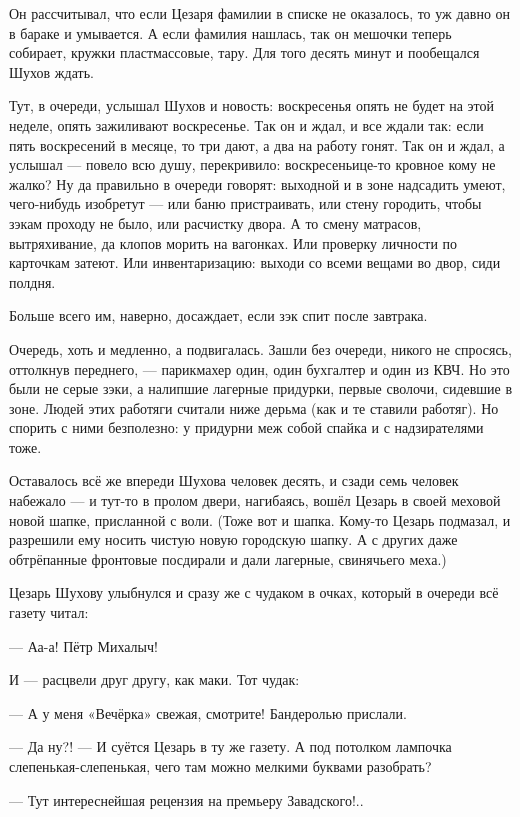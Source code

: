 Он рассчитывал, что если Цезаря фамилии в списке не оказалось, то уж давно он в бараке и 
умывается. А если фамилия нашлась, так он мешочки теперь собирает, кружки пластмассовые, 
тару. Для того десять минут и пообещался Шухов ждать.

Тут, в очереди, услышал Шухов и новость: воскресенья опять не будет на этой неделе, опять 
зажиливают воскресенье. Так он и ждал, и все ждали так: если пять воскресений в месяце, то три 
дают, а два на работу гонят. Так он и ждал, а услышал --- повело всю душу, перекривило: 
воскресеньице-то кровное кому не жалко? Ну да правильно в очереди говорят: выходной и в зоне 
надсадить умеют, чего-нибудь изобретут --- или баню пристраивать, или стену городить, чтобы 
зэкам проходу не было, или расчистку двора. А то смену матрасов, вытряхивание, да клопов 
морить на вагонках. Или проверку личности по карточкам затеют. Или инвентаризацию: выходи со 
всеми вещами во двор, сиди полдня.

Больше всего им, наверно, досаждает, если зэк спит после завтрака.

Очередь, хоть и медленно, а подвигалась. Зашли без очереди, никого не спросясь, оттолкнув 
переднего, --- парикмахер один, один бухгалтер и один из КВЧ. Но это были не серые зэки, а 
налипшие лагерные придурки, первые сволочи, сидевшие в зоне. Людей этих работяги считали 
ниже дерьма (как и те ставили работяг). Но спорить с ними безполезно: у придурни меж собой 
спайка и с надзирателями тоже.

Оставалось всё же впереди Шухова человек десять, и сзади семь человек набежало --- и тут-то в 
пролом двери, нагибаясь, вошёл Цезарь в своей меховой новой шапке, присланной с воли. (Тоже 
вот и шапка. Кому-то Цезарь подмазал, и разрешили ему носить чистую новую городскую шапку. А с 
других даже обтрёпанные фронтовые посдирали и дали лагерные, свинячьего меха.)

Цезарь Шухову улыбнулся и сразу же с чудаком в очках, который в очереди всё газету читал:

--- Аа-а! Пётр Михалыч!

И --- расцвели друг другу, как маки. Тот чудак:

--- А у меня «Вечёрка» свежая, смотрите! Бандеролью прислали.

--- Да ну?! --- И суётся Цезарь в ту же газету. А под потолком лампочка слепенькая-слепенькая, 
чего там можно мелкими буквами разобрать?

--- Тут интереснейшая рецензия на премьеру Завадского!..


